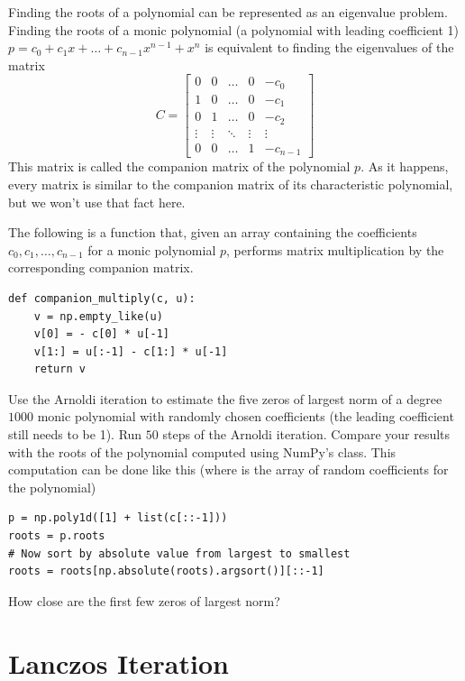 \begin{problem}
Finding the roots of a polynomial can be represented as an eigenvalue problem.
Finding the roots of a monic polynomial (a polynomial with leading coefficient 1) $p = c_0 + c_1 x + \dots + c_{n-1} x^{n-1} + x^n$ is equivalent to finding the eigenvalues of the matrix
\[C = \begin{bmatrix}
0 & 0 & \dots & 0 & -c_0 \\
1 & 0 & \dots & 0 & -c_1 \\
0 & 1 & \dots & 0 & -c_2 \\
\vdots & \vdots & \ddots & \vdots & \vdots \\
0 & 0 & \dots & 1 & -c_{n-1} \end{bmatrix}\]
This matrix is called the companion matrix of the polynomial $p$.
As it happens, every matrix is similar to the companion matrix of its characteristic polynomial, but we won't use that fact here.

The following is a function that, given an array containing the coefficients $c_0, c_1, \dots, c_{n-1}$ for a monic polynomial $p$, performs matrix multiplication by the corresponding companion matrix.
\begin{lstlisting}
def companion_multiply(c, u):
    v = np.empty_like(u)
    v[0] = - c[0] * u[-1]
    v[1:] = u[:-1] - c[1:] * u[-1]
    return v
\end{lstlisting}

Use the Arnoldi iteration to estimate the five zeros of largest norm of a degree $1000$ monic polynomial with randomly chosen coefficients (the leading coefficient still needs to be 1).
Run $50$ steps of the Arnoldi iteration.
Compare your results with the roots of the polynomial computed using NumPy's  class.
This computation can be done like this (where  is the array of random coefficients for the polynomial)
\begin{lstlisting}
p = np.poly1d([1] + list(c[::-1]))
roots = p.roots
# Now sort by absolute value from largest to smallest
roots = roots[np.absolute(roots).argsort()][::-1]
\end{lstlisting}
How close are the first few zeros of largest norm?
\end{problem}

\section*{Lanczos Iteration}


